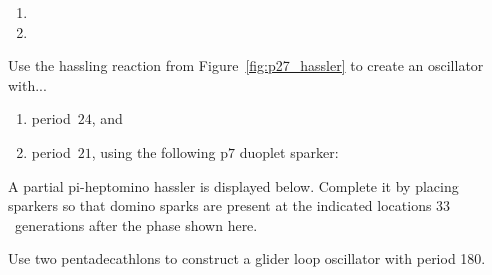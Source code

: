 \begin{multicols}{2}
\begin{problemstar}
\begin{multicols}{2}
\begin{enumerate}
				\item[\bf\color{ocre}(c)] 
				
				\item[\bf\color{ocre}(b)] 
			\end{enumerate}
		\end{multicols}
	\end{problemstar}
	
	
	\mfilbreak
	
	
	\begin{problem}\label{exer:pond_block_hasslers} 
		Use the hassling reaction from Figure~\ref{fig:p27_hassler} to create an oscillator with...\smallskip
		
		\begin{enumerate}[label=\bf\color{ocre}(\alph*)]
			\item period~$24$, and%
			
			\item period~$21$, using the following p$7$ duoplet sparker:
			
			\begin{center}
			\end{center}
		\end{enumerate}
	\end{problem}
	
	
	\mfilbreak
	
	
	\begin{problemstar}\label{exer:p44_pi_hassler} 
		A partial pi-heptomino hassler is displayed below. Complete it by placing sparkers so that domino sparks are present at the indicated locations $33$~generations after the phase shown here.
		
		\begin{center}
		\end{center}
		
	\end{problemstar}
	
	
	\mfilbreak
	
	
	\begin{problem}\label{exer:pentadecathlon_relay_180} 
		Use two pentadecathlons to construct a glider loop oscillator with period 180.
	\end{problem}
	

\end{multicols}
